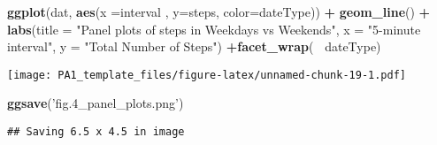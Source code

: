 \documentclass[]{article}
\newenvironment{Shaded}{\begin{snugshade}}{\end{snugshade}}
\newcommand{\DataTypeTok}[1]{\textcolor[rgb]{0.13,0.29,0.53}{#1}}
\newcommand{\KeywordTok}[1]{\textcolor[rgb]{0.13,0.29,0.53}{\textbf{#1}}}
\newcommand{\NormalTok}[1]{#1}
\newcommand{\OperatorTok}[1]{\textcolor[rgb]{0.81,0.36,0.00}{\textbf{#1}}}
\newcommand{\StringTok}[1]{\textcolor[rgb]{0.31,0.60,0.02}{#1}}
\begin{document}
\begin{Shaded}
\begin{Highlighting}[]
\KeywordTok{ggplot}\NormalTok{(dat, }\KeywordTok{aes}\NormalTok{(}\DataTypeTok{x =}\NormalTok{interval , }\DataTypeTok{y=}\NormalTok{steps, }\DataTypeTok{color=}\NormalTok{dateType)) }\OperatorTok{+}
\StringTok{       }\KeywordTok{geom_line}\NormalTok{() }\OperatorTok{+}\StringTok{ }\KeywordTok{labs}\NormalTok{(}\DataTypeTok{title =} \StringTok{"Panel plots of steps in Weekdays vs Weekends"}\NormalTok{, }\DataTypeTok{x =} \StringTok{"5-minute interval"}\NormalTok{, }\DataTypeTok{y =} \StringTok{"Total Number of Steps"}\NormalTok{) }\OperatorTok{+}\KeywordTok{facet_wrap}\NormalTok{(}\OperatorTok{~}\StringTok{ }\NormalTok{dateType)}
\end{Highlighting}
\end{Shaded}

\texttt{[image: PA1\_template\_files/figure-latex/unnamed-chunk-19-1.pdf]}

\begin{Shaded}
\begin{Highlighting}[]
\KeywordTok{ggsave}\NormalTok{(}\StringTok{'fig.4_panel_plots.png'}\NormalTok{)}
\end{Highlighting}
\end{Shaded}

\begin{verbatim}
## Saving 6.5 x 4.5 in image
\end{verbatim}
\end{document}

